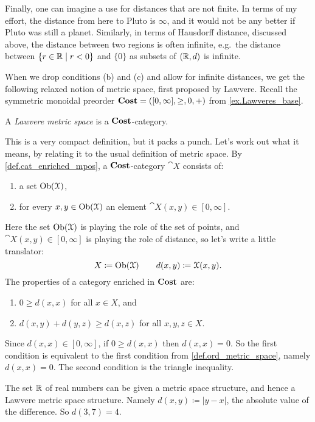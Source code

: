 \documentclass[7Sketches]{subfiles}
\begin{document}
Finally, one can imagine a use for distances that are not finite. In terms of my effort, the distance from here to Pluto is $\infty$, and it would not be any better if Pluto was still a planet. Similarly, in terms of Hausdorff distance, discussed above, the distance between two regions is often infinite, e.g.\ the distance between $\{r\in\mathbb{R}\mid r<0\}$ and $\{0\}$ as subsets of $(\mathbb{R},d)$ is infinite.

When we drop conditions (b) and (c) and allow for infinite distances, we get the following relaxed notion of metric space, first proposed by Lawvere. Recall the symmetric monoidal preorder $\mathbf{Cost}=([0,\infty],\geq,0,+)$ from \cref{ex.Lawveres_base}.

\begin{definition} %
\label{def.Lawvere_metric_space}%
%
A \emph{Lawvere metric space} is a $\mathbf{Cost}$-category.
\end{definition}

This is a very compact definition, but it packs a punch. Let's work out what it means, by relating it to the usual definition of metric space. By \cref{def.cat_enriched_mpos}, a $\mathbf{Cost}$-category $\cat{X}$  consists of:
\begin{enumerate}[label=(\roman*)]
	\item a set $\operatorname{Ob}(\mathcal{X})$,
	\item for every $x,y\in \operatorname{Ob}(\mathcal{X})$ an element $\cat{X}(x,y)\in[0,\infty]$. 
\end{enumerate}
Here the set $\operatorname{Ob}(\mathcal{X})$ is playing the role of the set of points, and $\cat{X}(x,y)\in[0,\infty]$ is playing the role of distance, so let's write a little translator:
\[X\coloneqq\operatorname{Ob}(\mathcal{X})\qquad d(x,y)\coloneqq\mathcal{X}(x,y).\]
The properties of a category enriched in $\mathbf{Cost}$ are:
\begin{enumerate}[label=(\alph*)]
	\item $0\geq d(x,x)$ for all $x\in X$, and
	\item $d(x,y)+d(y,z)\geq d(x,z)$ for all $x,y,z\in X$.
\end{enumerate}
Since $d(x,x)\in[0,\infty]$, if $0\geq d(x,x)$ then $d(x,x)=0$. So the first
condition is equivalent to the first condition from \cref{def.ord_metric_space},
namely $d(x,x)=0$. The second condition is the triangle inequality.


\begin{example}%
\label{ex.reals_as_metric_space}%
The set $\mathbb{R}$ of real numbers can be given a metric space structure, and hence a Lawvere metric space structure. Namely $d(x,y)\coloneqq|y-x|$, the absolute value of the difference. So $d(3,7)=4$.
\end{example}
\end{document}
